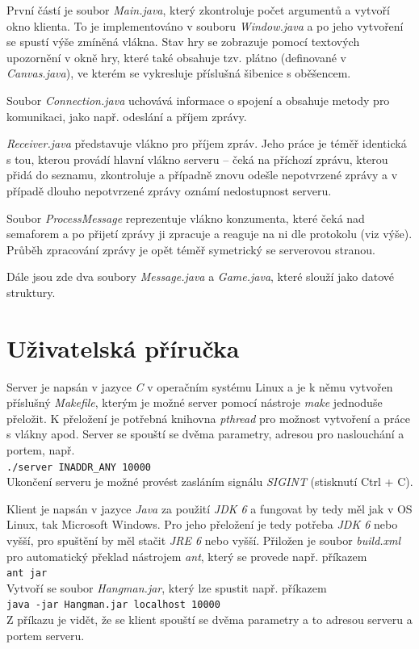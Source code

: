 \documentclass[12pt, a4paper]{article}
\begin{document}
		První částí je soubor \emph{Main.java}, který zkontroluje počet argumentů a vytvoří okno klienta. To je implementováno v souboru \emph{Window.java} a po jeho vytvoření se spustí výše zmíněná vlákna. Stav hry se zobrazuje pomocí textových upozornění v okně hry, které také obsahuje tzv. plátno (definované v \emph{Canvas.java}), ve kterém se vykresluje příslušná šibenice s oběšencem.
		
		Soubor \emph{Connection.java} uchovává informace o spojení a obsahuje metody pro komunikaci, jako např. odeslání a příjem zprávy.
		
		\emph{Receiver.java} představuje vlákno pro příjem zpráv. Jeho práce je téměř identická s tou, kterou provádí hlavní vlákno serveru -- čeká na příchozí zprávu, kterou přidá do seznamu, zkontroluje a případně znovu odešle nepotvrzené zprávy a v případě dlouho nepotvrzené zprávy oznámí nedostupnost serveru.
		
		Soubor \emph{ProcessMessage} reprezentuje vlákno konzumenta, které čeká nad semaforem a po přijetí zprávy ji zpracuje a reaguje na ni dle protokolu (viz výše). Průběh zpracování zprávy je opět téměř symetrický se serverovou stranou.
		
		Dále jsou zde dva soubory \emph{Message.java} a \emph{Game.java}, které slouží jako datové struktury.
		
	\section{Uživatelská příručka}
	Server je napsán v jazyce \emph{C} v operačním systému Linux a je k němu vytvořen příslušný \emph{Makefile}, kterým je možné server pomocí nástroje \emph{make} jednoduše přeložit. K přeložení je potřebná knihovna \emph{pthread} pro možnost vytvoření a práce s vlákny apod. Server se spouští se dvěma parametry, adresou pro naslouchání a portem, např.\\
	\texttt{./server INADDR\_ANY 10000}\\
	Ukončení serveru je možné provést zasláním signálu \emph{SIGINT} (stisknutí Ctrl + C).
	
	Klient je napsán v jazyce \emph{Java} za použití \emph{JDK 6} a fungovat by tedy měl jak v OS Linux, tak Microsoft Windows. Pro jeho přeložení je tedy potřeba \emph{JDK 6} nebo vyšší, pro spuštění by měl stačit \emph{JRE 6} nebo vyšší. Přiložen je soubor \emph{build.xml} pro automatický překlad nástrojem \emph{ant}, který se provede např. příkazem\\
	\texttt{ant jar}\\
	Vytvoří se soubor \emph{Hangman.jar}, který lze spustit např. příkazem\\
	\texttt{java -jar Hangman.jar localhost 10000}\\
	Z příkazu je vidět, že se klient spouští se dvěma parametry a to adresou serveru a portem serveru.
	
\end{document}
